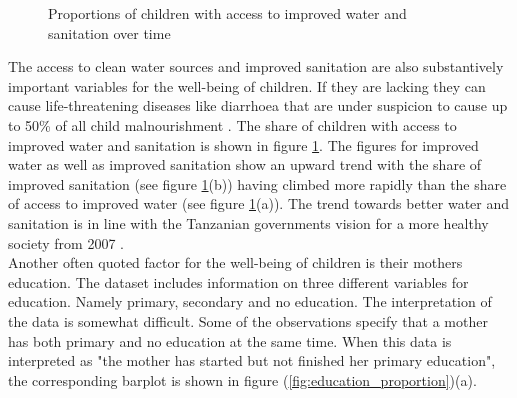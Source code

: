 \documentclass[a4paper, 11pt]{article} %
\begin{document}
\begin{figure}[!h]
    \centering
    \qquad
    \caption{Proportions of children with access to improved water and sanitation over time}%
    \label{fig:water_sanitation_proportion}%
\end{figure}

The access to clean water sources and improved sanitation are also substantively important variables for the well-being of children. If they are lacking they can cause life-threatening diseases like diarrhoea that are under suspicion to cause up to 50\% of all child malnourishment \cite{UNI18}. The share of children with access to improved water and sanitation is shown in figure \ref{fig:water_sanitation_proportion}. The figures for improved water as well as improved sanitation show an upward trend with the share of improved sanitation (see figure \ref{fig:water_sanitation_proportion}(b)) having climbed more rapidly than the share of access to improved water (see figure \ref{fig:water_sanitation_proportion}(a)). The trend towards better water and sanitation is in line with the Tanzanian governments vision for a more healthy society from 2007 \cite{Health2016Dec}. \\


Another often quoted factor for the well-being of children is their mothers education. The dataset includes information on three different variables for education. Namely primary, secondary and no education. The interpretation of the data is somewhat difficult. Some of the observations specify that a mother has both primary and no education at the same time. When this data is interpreted as "the mother has started but not finished her primary education", the corresponding barplot is shown in figure (\ref{fig:education_proportion})(a). 
\end{document}
